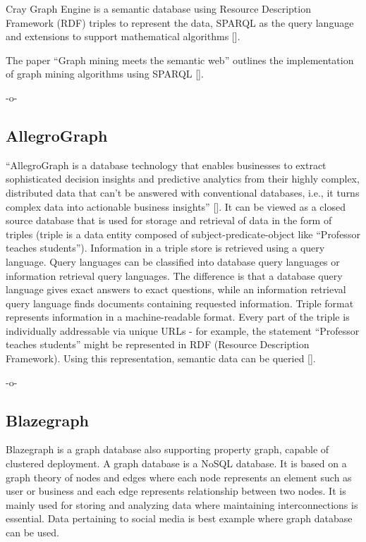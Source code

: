 Cray Graph Engine is a semantic database using Resource Description
Framework (RDF) triples to represent the data, SPARQL as the query
language and extensions to support mathematical
algorithms [\cite{paper-graph-data}].

The paper ``Graph mining meets the semantic web'' outlines the
implementation of graph mining algorithms using
SPARQL [\cite{paper-lee2015graph}].

     -o-

\subsection{AllegroGraph}
     
``AllegroGraph is a database technology that enables businesses to
extract sophisticated decision insights and predictive analytics from
their highly complex, distributed data that can't be answered with
conventional databases, i.e., it turns complex data into actionable
business insights'' [\cite{www-Allegro}]. It can be viewed as a closed
source database that is used for storage and retrieval of data in the
form of triples (triple is a data entity composed of
subject-predicate-object like ``Professor teaches students'').
Information in a triple store is retrieved using a query
language. Query languages can be classified into database query
languages or information retrieval query languages. The difference is
that a database query language gives exact answers to exact questions,
while an information retrieval query language finds documents
containing requested information.  Triple format represents
information in a machine-readable format.  Every part of the triple is
individually addressable via unique URLs - for example, the statement
``Professor teaches students'' might be represented in RDF (Resource
Description Framework). Using this representation, semantic data can
be queried [\cite{www-Allegrow}].

     -o-

\subsection{Blazegraph}

Blazegraph is a graph database also supporting property graph, capable
of clustered deployment. A graph database is a NoSQL database. It is
based on a graph theory of nodes and edges where each node represents
an element such as user or business and each edge represents
relationship between two nodes. It is mainly used for storing and
analyzing data where maintaining interconnections is essential. Data
pertaining to social media is best example where graph database can be
used.

